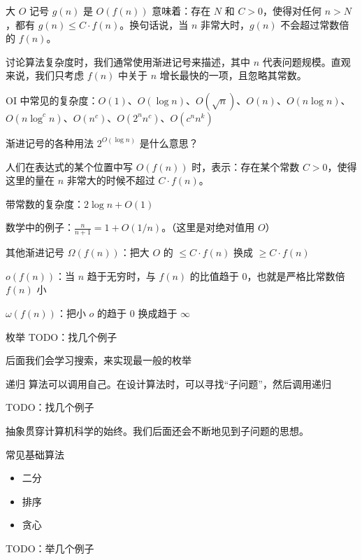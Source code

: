 \documentclass[11pt,aspectratio=169]{beamer}
\begin{document}
\begin{frame}{大 $O$ 记号}
    $g(n)$ 是 $O(f(n))$ 意味着：存在 $N$ 和 $C>0$，使得对任何 $n>N$，都有 $g(n)\le C\cdot f(n)$。换句话说，当 $n$ 非常大时，$g(n)$ 不会超过常数倍的 $f(n)$。
    
    讨论算法复杂度时，我们通常使用渐进记号来描述，其中 $n$ 代表问题规模。直观来说，我们只考虑 $f(n)$ 中关于 $n$ 增长最快的一项，且忽略其常数。

    OI 中常见的复杂度：$O(1)$、$O(\log n)$、$O(\sqrt{n})$、$O(n)$、$O(n\log n)$、$O(n\log^c n)$、$O(n^c)$、$O(2^n n^c)$、$O(c^n n^k)$
\end{frame}
\begin{frame}{渐进记号的各种用法}
    $2^{O(\log n)}$ 是什么意思？

    人们在表达式的某个位置中写 $O(f(n))$ 时，表示：存在某个常数 $C>0$，使得这里的量在 $n$ 非常大的时候不超过 $C\cdot f(n)$。

    带常数的复杂度：$2\log n+O(1)$

    数学中的例子：$\frac{n}{n+1}=1+O(1/n)$。（这里是对绝对值用 $O$）

\end{frame}
\begin{frame}{其他渐进记号}
    $\Omega(f(n))$：把大 $O$ 的 $\le C\cdot f(n)$ 换成 $\ge C\cdot f(n)$

    $o(f(n))$：当 $n$ 趋于无穷时，与 $f(n)$ 的比值趋于 $0$，也就是严格比常数倍 $f(n)$ 小

    $\omega(f(n))$：把小 $o$ 的趋于 $0$ 换成趋于 $\infty$
    
\end{frame}

\begin{frame}{枚举}
    TODO：找几个例子

    后面我们会学习搜索，来实现最一般的枚举
\end{frame}

\begin{frame}{递归}
    算法可以调用自己。在设计算法时，可以寻找“子问题”，然后调用递归

    TODO：找几个例子

    抽象贯穿计算机科学的始终。我们后面还会不断地见到子问题的思想。
\end{frame}

\begin{frame}{常见基础算法}
\begin{itemize}
    \item 二分
    \item 排序
    \item 贪心
\end{itemize}
TODO：举几个例子
\end{frame}
\end{document}
